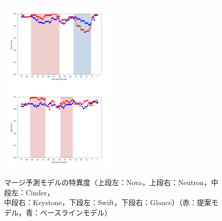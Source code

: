 \documentclass[11pt]{jreport}
\begin{document}
\begin{figure}[H]
\begin{minipage}{\textwidth}
\begin{center}
    \includegraphics[width=0.495\textwidth]{Uenaka_fig/RQ2_result/Swift_merge_Specificity.pdf}
    \includegraphics[width=0.495\textwidth]{Uenaka_fig/RQ2_result/Glance_merge_Specificity.pdf}
    \caption{マージ予測モデルの特異度（上段左：Nova，上段右：Neutron，中段左：Cinder，\\ 中段右：Keystone，下段左：Swift，下段右：Glance）（赤：提案モデル，青：ベースラインモデル）}
    \label{fig:merge_spec}
\end{center}
\vspace{0.08\textheight}
\end{minipage}
\end{figure}
\end{document}
